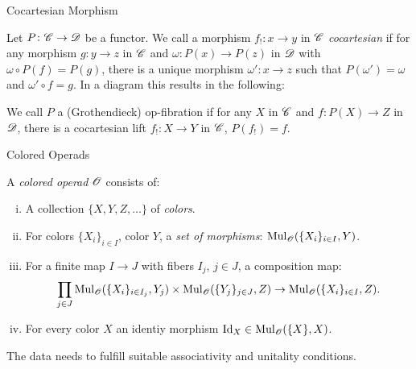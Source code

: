 \begin{frame}[fragile]{Cocartesian Morphism}
    \begin{defin}
     Let $P \colon \mathscr{C} \to \mathscr{D} $ be a functor.
        We call a morphism $f_! \colon x \to y$ in $\mathscr{C}$ {\em cocartesian} if for any morphism $g \colon  y \to z$ in $\mathscr{C}$ and
        $\omega \colon P(x) \to P(z)$ in $\mathscr{D}$ with $\omega \circ P(f) = P(g)$,
        there is a unique morphism $\omega' \colon x \to z$ such that
        $P(\omega')=\omega$ and $\omega' \circ f = g$. In a diagram this results
        in the following:
        \begin{center}
        \end{center}
      \end{defin}

      \begin{defin}
        We call $P$ a (Grothendieck) op-fibration if for any $X$ in $\mathscr{C}$ and $f \colon P(X) \to Z$ in $\mathscr{D}$, there is a cocartesian lift $f_! \colon X \to Y$ in $\mathscr{C}$, $P(f_!)=f$.
      \end{defin}
\end{frame}

\begin{frame}[fragile]{Colored Operads}
  \small{\begin{defin} 
    A {\em colored operad} $\mathscr{O}$ consists of:
    \begin{enumerate}[(i)]
        \item A collection $\{X,Y,Z, \dots\}$ of
        \emph{colors}.
        \item For colors $\{X_i\}_{i \in I}$,
        color $Y$, a {\em set of morphisms}:
        $\operatorname{Mul}_{\mathscr{O}}(\{X_i\}_{i \in I}, Y)$.
        \item For a finite map $I \to J$ with fibers $I_j$, $j \in J$, 
        a composition map:
        \[
            \prod_{j \in J} \operatorname{Mul}_{\mathscr{O}}(\{X_i\}_{i \in I_j}, Y_j) \times \operatorname{Mul}_{\mathscr{O}}(\{Y_j\}_{j\in J}, Z) \to \operatorname{Mul}_{\mathscr{O}}(\{X_i\}_{i \in I}, Z).  
        \]
        \item For every color $X$ an identiy morphism $\operatorname{Id}_X \in \operatorname{Mul}_{\mathscr{O}}(\{X\},X)$.
        \end{enumerate}
        The data needs to fulfill suitable associativity and unitality conditions.

  \end{defin}}
\end{frame}

